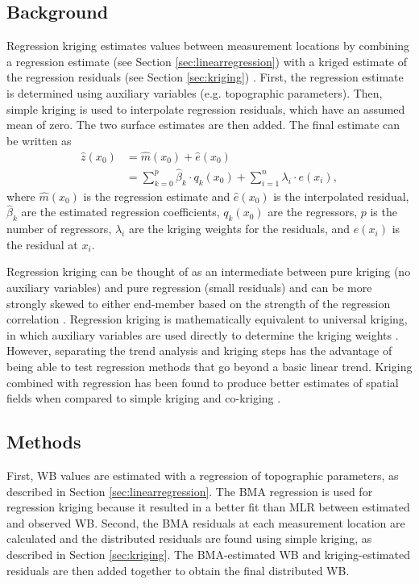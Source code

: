 \documentclass{sfuthesis}
\begin{document}
\subsection{Background}

Regression kriging estimates values between measurement locations by combining a regression estimate (see Section \ref{sec:linearregression}) with a kriged estimate of the regression residuals (see Section \ref{sec:kriging}) \citep{Hengl2007}. First, the regression estimate is determined using auxiliary variables (e.g. topographic parameters). Then, simple kriging is used to interpolate regression residuals, which have an assumed mean of zero. The two surface estimates are then added. The final estimate can be written as 
\begin{align}
\hat{z}(x_0) &= \hat{m}(x_0) + \hat{e}(x_0)\\
& = \sum^p_{k=0}\hat{\beta}_k \cdot	q_k(x_0)+ \sum_{i=1}^{n} \lambda_i \cdot e(x_i),
\end{align}
where $\hat{m}(x_0)$ is the regression estimate and $\hat{e}(x_0)$ is the interpolated residual, $\hat{\beta}_k$ are the estimated regression coefficients, $q_k(x_0)$ are the regressors, $p$ is the number of regressors, $\lambda_i$ are the kriging weights for the residuals, and $e(x_i)$ is the residual at $x_i$.

Regression kriging can be thought of as an intermediate between pure kriging (no auxiliary variables) and pure regression (small residuals) and can be more strongly skewed to either end-member based on the strength of the regression correlation \citep{Hengl2007}. Regression kriging is mathematically equivalent to universal kriging, in which auxiliary variables are used directly to determine the kriging weights \citep{Hengl2007}. However, separating the trend analysis and kriging steps has the advantage of being able to test regression methods that go beyond a basic linear trend. Kriging combined with regression has been found to produce better estimates of spatial fields when compared to simple kriging and co-kriging \citep{Knotters1995}.

\subsection{Methods}

First, WB values are estimated with a regression of topographic parameters, as described in Section \ref{sec:linearregression}. The BMA regression is used for regression kriging because it resulted in a better fit than MLR between estimated and observed WB. Second, the BMA residuals at each measurement location are calculated and the distributed residuals are found using simple kriging, as described in Section \ref{sec:kriging}. The BMA-estimated  WB and kriging-estimated residuals are then added together to obtain the final distributed WB. 
\end{document}
